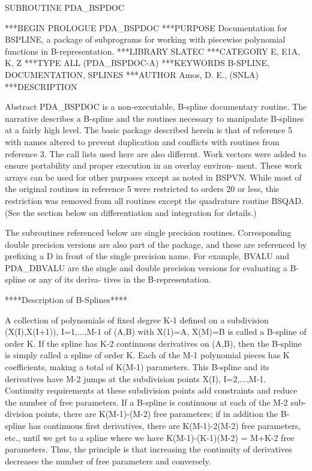 \documentclass[11pt,twoside,nolof]{starlink}
\begin{document}
\begin{terminalv}
      SUBROUTINE PDA_BSPDOC


***BEGIN PROLOGUE  PDA_BSPDOC
***PURPOSE  Documentation for BSPLINE, a package of subprograms for
            working with piecewise polynomial functions
            in B-representation.
***LIBRARY   SLATEC
***CATEGORY  E, E1A, K, Z
***TYPE      ALL (PDA_BSPDOC-A)
***KEYWORDS  B-SPLINE, DOCUMENTATION, SPLINES
***AUTHOR  Amos, D. E., (SNLA)
***DESCRIPTION

     Abstract
         PDA_BSPDOC is a non-executable, B-spline documentary routine.
         The narrative describes a B-spline and the routines
         necessary to manipulate B-splines at a fairly high level.
         The basic package described herein is that of reference
         5 with names altered to prevent duplication and conflicts
         with routines from reference 3.  The call lists used here
         are also different.  Work vectors were added to ensure
         portability and proper execution in an overlay environ-
         ment.  These work arrays can be used for other purposes
         except as noted in BSPVN.  While most of the original
         routines in reference 5 were restricted to orders 20
         or less, this restriction was removed from all routines
         except the quadrature routine BSQAD.  (See the section
         below on differentiation and integration for details.)

         The subroutines referenced below are single precision
         routines.  Corresponding double precision versions are also
         part of the package, and these are referenced by prefixing
         a D in front of the single precision name.  For example,
         BVALU and PDA_DBVALU are the single and double precision
         versions for evaluating a B-spline or any of its deriva-
         tives in the B-representation.

                ****Description of B-Splines****

     A collection of polynomials of fixed degree K-1 defined on a
     subdivision (X(I),X(I+1)), I=1,...,M-1 of (A,B) with X(1)=A,
     X(M)=B is called a B-spline of order K.  If the spline has K-2
     continuous derivatives on (A,B), then the B-spline is simply
     called a spline of order K.  Each of the M-1 polynomial pieces
     has K coefficients, making a total of K(M-1) parameters.  This
     B-spline and its derivatives have M-2 jumps at the subdivision
     points X(I), I=2,...,M-1.  Continuity requirements at these
     subdivision points add constraints and reduce the number of free
     parameters.  If a B-spline is continuous at each of the M-2 sub-
     division points, there are K(M-1)-(M-2) free parameters; if in
     addition the B-spline has continuous first derivatives, there
     are K(M-1)-2(M-2) free parameters, etc., until we get to a
     spline where we have K(M-1)-(K-1)(M-2) = M+K-2 free parameters.
     Thus, the principle is that increasing the continuity of
     derivatives decreases the number of free parameters and
     conversely.


\end{terminalv}
\end{document}
